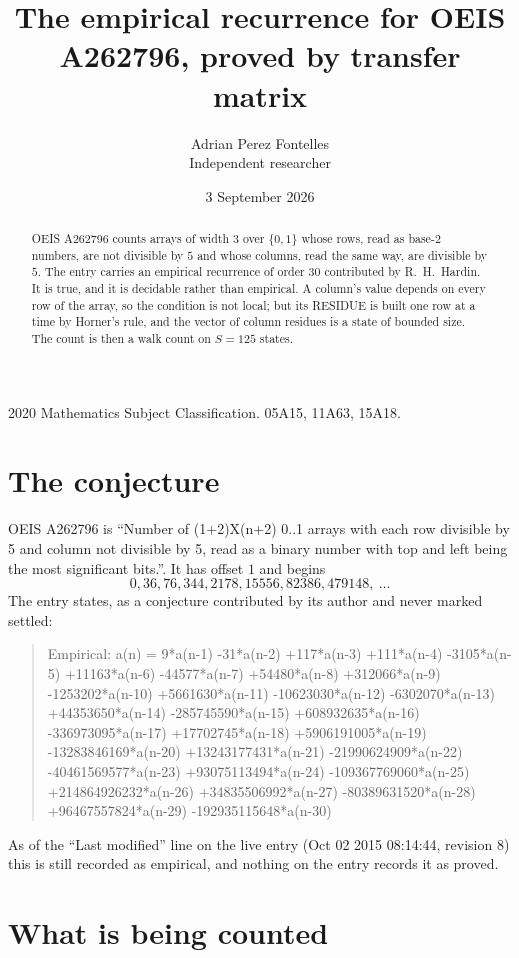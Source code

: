 \documentclass[11pt,a4paper]{article}
\title{The empirical recurrence for OEIS A262796, proved by transfer matrix}
\author{Adrian Perez Fontelles\\ \small Independent researcher}
\date{3 September 2026}
\theoremstyle{plain}
\theoremstyle{definition}
\begin{document}
\maketitle

\begin{abstract}
OEIS A262796 counts arrays of width $3$ over $\{0,1\}$ whose rows, read as base-$2$
numbers, are not divisible by $5$ and whose columns, read the same way, are divisible by
$5$. The entry carries an empirical recurrence of order $30$ contributed by
R.~H.~Hardin. It is true, and it is decidable rather than empirical. A column's value depends on
every row of the array, so the condition is not local; but its RESIDUE is built one row at a
time by Horner's rule, and the vector of column residues is a state of bounded size. The count
is then a walk count on $S=125$ states.
\end{abstract}

\noindent\small 2020 Mathematics Subject Classification. 05A15, 11A63, 15A18.\normalsize

\section{The conjecture}

OEIS A262796 is ``Number of (1+2)X(n+2) 0..1 arrays with each row divisible by 5 and column not divisible by 5, read as a binary number with top and left being the most significant bits.''. It has offset $1$ and begins
\[
0, 36, 76, 344, 2178, 15556, 82386, 479148,\ \dots
\]
The entry states, as a conjecture contributed by its author and never marked settled:
\begin{quote}
Empirical: a(n) = 9*a(n-1) -31*a(n-2) +117*a(n-3) +111*a(n-4) -3105*a(n-5) +11163*a(n-6) -44577*a(n-7) +54480*a(n-8) +312066*a(n-9) -1253202*a(n-10) +5661630*a(n-11) -10623030*a(n-12) -6302070*a(n-13) +44353650*a(n-14) -285745590*a(n-15) +608932635*a(n-16) -336973095*a(n-17) +17702745*a(n-18) +5906191005*a(n-19) -13283846169*a(n-20) +13243177431*a(n-21) -21990624909*a(n-22) -40461569577*a(n-23) +93075113494*a(n-24) -109367769060*a(n-25) +214864926232*a(n-26) +34835506992*a(n-27) -80389631520*a(n-28) +96467557824*a(n-29) -192935115648*a(n-30)
\end{quote}
As of the ``Last modified'' line on the live entry (Oct 02 2015 08:14:44, revision 8) this is still
recorded as empirical, and nothing on the entry records it as proved.

\section{What is being counted}
\end{document}
